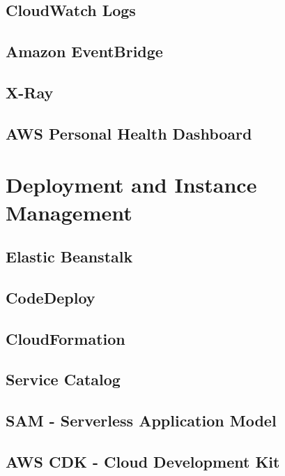 \documentclass[11pt]{book}
\begin{document}
    \section{CloudWatch Logs}


    \section{Amazon EventBridge}


    \section{X-Ray}


    \section{AWS Personal Health Dashboard}


    \chapter{Deployment and Instance Management}


    \section{Elastic Beanstalk}


    \section{CodeDeploy}


    \section{CloudFormation}


    \section{Service Catalog}


    \section{SAM - Serverless Application Model}


    \section{AWS CDK - Cloud Development Kit}
\end{document}
